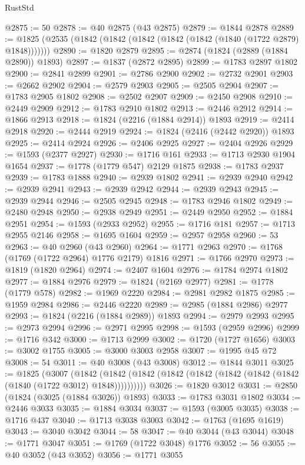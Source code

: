 \begin{lexlean}{RustStd}
\begin{coremodule}
@2875 := 50
@2878 := @40 @2875 (@43 @2875)
@2879 := @1844 @2878
@2889 := @1825 (@2535 (@1842 (@1842 (@1842 (@1842 (@1842 (@1840 (@1722 @2879) @1848)))))))
@2890 := @1820 @2879
@2895 := @2874 (@1824 (@2889 (@1884 @2890)) @1893)
@2897 := @1837 (@2872 @2895)
@2899 := @1783 @2897 @1802
@2900 := @2841 @2899
@2901 := @2786 @2900
@2902 := @2732 @2901
@2903 := @2662 @2902
@2904 := @2579 @2903
@2905 := @2505 @2904
@2907 := @1783 @2905 @1802
@2908 := @2502 @2907
@2909 := @2450 @2908
@2910 := @2449 @2909
@2912 := @1783 @2910 @1802
@2913 := @2446 @2912
@2914 := @1866 @2913
@2918 := @1824 (@2216 (@1884 @2914)) @1893
@2919 := @2414 @2918
@2920 := @2444 @2919
@2924 := @1824 (@2416 (@2442 @2920)) @1893
@2925 := @2414 @2924
@2926 := @2406 @2925
@2927 := @2404 @2926
@2929 := @1593 (@2377 @2927)
@2930 := @1716 @161
@2933 := @1713 @2930 @1904 @1654
@2937 := @1778 (@1779 @547) @2129 @1875
@2938 := @1783 @2937
@2939 := @1783 @1888
@2940 := @2939 @1802
@2941 := @2939 @2940
@2942 := @2939 @2941
@2943 := @2939 @2942
@2944 := @2939 @2943
@2945 := @2939 @2944
@2946 := @2505 @2945
@2948 := @1783 @2946 @1802
@2949 := @2480 @2948
@2950 := @2938 @2949
@2951 := @2449 @2950
@2952 := @1884 @2951
@2954 := @1593 (@2933 @2952)
@2955 := @1716 @181
@2957 := @1713 @2955 @2146
@2958 := @1695 @1604
@2959 := @2957 @2958
@2960 := 53
@2963 := @40 @2960 (@43 @2960)
@2964 := @1771 @2963
@2970 := @1768 (@1769 (@1722 @2964) @1776 @2179) @1816
@2971 := @1766 @2970
@2973 := @1819 (@1820 @2964)
@2974 := @2407 @1604
@2976 := @1784 @2974 @1802
@2977 := @1884 @2976
@2979 := @1824 (@2169 @2977)
@2981 := @1778 (@1779 @578)
@2982 := @1969 @2220
@2984 := @2981 @2982 @1875
@2985 := @1959 @2984
@2986 := @2446 @2220
@2989 := @2985 (@1884 @2986) @2977
@2993 := @1824 (@2216 (@1884 @2989)) @1893
@2994 := @2979 @2993
@2995 := @2973 @2994
@2996 := @2971 @2995
@2998 := @1593 (@2959 @2996)
@2999 := @1716 @342
@3000 := @1713 @2999
@3002 := @1720 (@1727 @1656)
@3003 := @3002 @1755
@3005 := @3000 @3003 @2958
@3007 := @1995 @45 @72
@3008 := 54
@3011 := @40 @3008 (@43 @3008)
@3012 := @1844 @3011
@3025 := @1825
    (@3007
      (@1842 (@1842 (@1842 (@1842 (@1842 (@1842 (@1842 (@1842 (@1840 (@1722 @3012) @1848))))))))))
@3026 := @1820 @3012
@3031 := @2850 (@1824 (@3025 (@1884 @3026)) @1893)
@3033 := @1783 @3031 @1802
@3034 := @2446 @3033
@3035 := @1884 @3034
@3037 := @1593 (@3005 @3035)
@3038 := @1716 @437
@3040 := @1713 @3038 @3003
@3042 := @1763 (@1695 @1619)
@3043 := @3040 @3042
@3044 := 58
@3047 := @40 @3044 (@43 @3044)
@3048 := @1771 @3047
@3051 := @1769 (@1722 @3048) @1776
@3052 := 56
@3055 := @40 @3052 (@43 @3052)
@3056 := @1771 @3055

\end{coremodule}
\end{lexlean}
